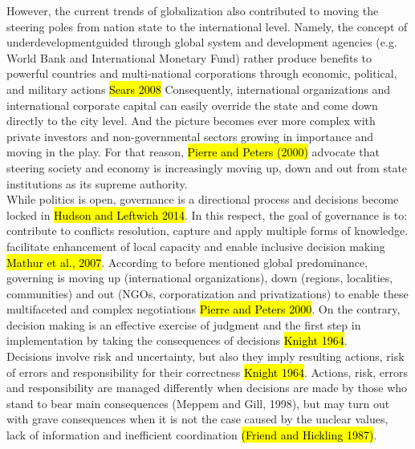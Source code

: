 \documentclass[11pt]{report}
\begin{document}
However, the current trends of globalization also contributed to moving the steering poles from nation state to the international level.
Namely, the concept of underdevelopment\footnotemark guided through global system and development agencies (e.g. World Bank and International Monetary Fund) rather produce benefits to powerful countries and multi-national corporations through economic, political, and military actions \hl{Sears 2008}
Consequently, international organizations and international corporate capital can easily override the state and come down directly to the city level.
And the picture becomes ever more complex with private investors and non-governmental sectors growing in importance and moving in the play.
For that reason, \hl{Pierre and Peters (2000)} advocate that steering society and economy is increasingly moving up, down and out from  state institutions as its supreme authority.
\\
While politics is open, governance is a directional process and decisions become locked in \hl{Hudson and Leftwich 2014}.
In this respect, the goal of governance is to: contribute to conflicts resolution, capture and apply multiple  forms  of  knowledge. facilitate enhancement of local capacity and enable inclusive decision making \hl{Mathur et al., 2007}.
According to before mentioned global predominance, governing is moving up (international organizations), down (regions, localities, communities) and out (NGOs, corporatization and privatizations) to enable these multifaceted and complex negotiations \hl{Pierre and Peters 2000}.
On the contrary, decision making is an effective exercise of judgment and the first step in implementation by taking the consequences of decisions \hl{Knight 1964}.
\\
Decisions involve risk and uncertainty, but also they imply resulting actions, risk of errors and responsibility for their correctness \hl{Knight 1964}.
Actions, risk, errors and responsibility are managed differently when decisions are made by those who stand to bear main consequences (Meppem and Gill, 1998), but may turn out with grave consequences when it is not the case caused by the unclear values, lack of information and inefficient coordination \hl{(Friend and Hickling 1987)}.
\end{document}
